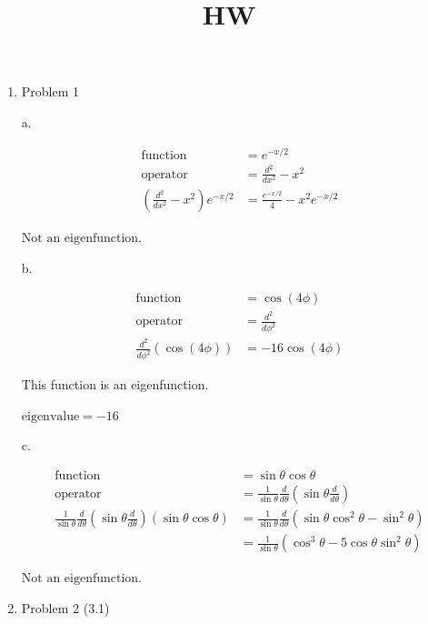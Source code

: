 \documentclass[12pt]{article}
\title{HW}
\date{}
\begin{document}
\begin{enumerate}

    \newpage
    \item Problem 1
    
    a.

    \begin{align*}
        \text{function} &= e^{-x/2} \\
        \text{operator} &= \frac{d^2}{dx^2} - x^2 \\
        \left(\frac{d^2}{dx^2} - x^2\right) e^{-x/2} &= \frac{e^{-x/2}}{4} - x^2 e^{-x/2}
    \end{align*}

    $\boxed{\text{Not an eigenfunction.}}$

    b.

    \begin{align*}
        \text{function} &= \cos\left(4\phi\right) \\
        \text{operator} &= \frac{d^2}{d\phi^2} \\
        \frac{d^2}{d\phi^2} \left(\cos\left(4\phi\right)\right) &= -16 \cos\left(4\phi\right)
    \end{align*}

    This function is an eigenfunction.

    $\boxed{\text{eigenvalue} = -16}$

    c.

    \begin{align*}
        \text{function} &= \sin\theta \cos\theta \\
        \text{operator} &= \frac{1}{\sin\theta} \frac{d}{d\theta}\left(\sin\theta 
        \frac{d}{d\theta}\right) \\
        \frac{1}{\sin\theta} \frac{d}{d\theta}\left(\sin\theta 
        \frac{d}{d\theta}\right) \left(\sin\theta \cos\theta\right) &= \frac{1}{\sin\theta} \frac{d}{d\theta} \left(\sin\theta\cos^2\theta - \sin^2\theta\right) \\
        &= \frac{1}{\sin\theta} \left(\cos^3\theta - 5\cos\theta\sin^2\theta \right)
    \end{align*}

    $\boxed{\text{Not an eigenfunction.}}$

    \newpage
    \item Problem 2 (3.1)
    

\end{enumerate}
\end{document}
